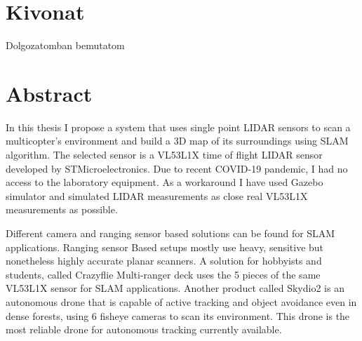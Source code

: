 \setcounter{page}{1}

\selecthungarian

\chapter*{Kivonat}
Dolgozatomban bemutatom 


\vfill
\selectenglish


\chapter*{Abstract}
In this thesis I propose a system that uses single point LIDAR sensors to scan a multicopter's environment and 
build a 3D map of its surroundings using SLAM algorithm. The selected sensor is a VL53L1X time of flight LIDAR
sensor developed by STMicroelectronics. Due to recent COVID-19 pandemic, I had no access to the laboratory 
equipment. As a workaround I have used Gazebo simulator and simulated LIDAR measurements as close
real VL53L1X measurements as possible. 

Different camera and ranging sensor based solutions can be found for SLAM applications. Ranging sensor Based
setups mostly use heavy, sensitive but nonetheless highly accurate planar scanners. A solution for hobbyists 
and students, called Crazyflie Multi-ranger deck uses the 5 pieces of the same VL53L1X sensor 
for SLAM applications. Another product called Skydio2 is an autonomous drone that is capable of active 
tracking and object avoidance even in dense forests, using 6 fisheye cameras to scan its environment. This 
drone is the most reliable drone for autonomous tracking currently available.

